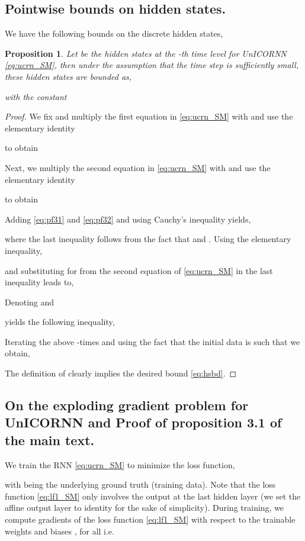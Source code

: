 \documentclass{article}
\newtheorem{proposition}[theorem]{Proposition}
\begin{document}
\subsection{Pointwise bounds on hidden states.}
We have the following bounds on the discrete hidden states, 
\begin{proposition}
\label{prop:31}
Let  be the hidden states at the -th time level  for UnICORNN \eqref{eq:ucrn_SM}, then under the assumption that the time step  is sufficiently small, these hidden states are bounded as,

with the constant 

\end{proposition}
\begin{proof}
We fix  and multiply the first equation in \eqref{eq:ucrn_SM} with  and use the elementary identity 

to obtain

Next, we multiply the second equation in \eqref{eq:ucrn_SM} with  and use the elementary identity 

to obtain

Adding \eqref{eq:pf31} and \eqref{eq:pf32} and using Cauchy's inequality yields,

where the last inequality follows from the fact that  and .
Using the elementary inequality,

and substituting for  from the second equation of \eqref{eq:ucrn_SM} in the last inequality leads to,

Denoting  and 

yields the following inequality,

Iterating the above -times and using the fact that the initial data is such that  we obtain,

The definition of  clearly implies the desired bound \eqref{eq:hsbd}.
\end{proof}
\subsection{On the exploding gradient problem for UnICORNN and Proof of proposition 3.1 of the main text.}
We train the RNN \eqref{eq:ucrn_SM} to minimize the loss function,

with  being the underlying ground truth (training data). Note that the loss function \eqref{eq:lf1_SM} only involves the output at the last hidden layer (we set the affine output layer to identity for the sake of simplicity). During training, we compute gradients of the loss function \eqref{eq:lf1_SM} with respect to the trainable weights and biases , for all  i.e.
 
\end{document}
